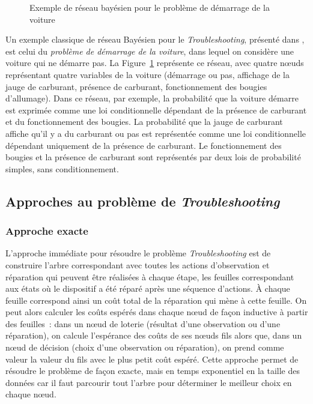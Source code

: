 \documentclass[a4paper,11pt]{article}
\theoremstyle{plain}
\theoremstyle{definition}
\begin{document}
\begin{figure}[ht]
\centering
{}
\caption{Exemple de réseau bayésien pour le problème de démarrage de la voiture}%
\label{FigExplBayesien}%
\end{figure}

Un exemple classique de réseau Bayésien pour le \emph{Troubleshooting}, présenté dans \cite{Jensen_2007}, est celui du \emph{problème de démarrage de la voiture}, dans lequel on considère une voiture qui ne démarre pas. La Figure~\ref{FigExplBayesien} représente ce réseau, avec quatre nœuds représentant quatre variables de la voiture (démarrage ou pas, affichage de la jauge de carburant, présence de carburant, fonctionnement des bougies d'allumage). Dans ce réseau, par exemple, la probabilité que la voiture démarre est exprimée comme une loi conditionnelle dépendant de la présence de carburant et du fonctionnement des bougies. La probabilité que la jauge de carburant affiche qu'il y a du carburant ou pas est représentée comme une loi conditionnelle dépendant uniquement de la présence de carburant. Le fonctionnement des bougies et la présence de carburant sont représentés par deux lois de probabilité simples, sans conditionnement.

\subsection{Approches au problème de \emph{Troubleshooting}}
\label{SecApprochesTrouble}

\subsubsection{Approche exacte}
\label{SecAlgoExacte}

L'approche immédiate pour résoudre le problème \emph{Troubleshooting} est de construire l'arbre correspondant avec toutes les actions d'observation et réparation qui peuvent être réalisées à chaque étape, les feuilles correspondant aux états où le dispositif a été réparé après une séquence d'actions. À chaque feuille correspond ainsi un coût total de la réparation qui mène à cette feuille. On peut alors calculer les coûts espérés dans chaque nœud de façon inductive à partir des feuilles~: dans un nœud de loterie (résultat d'une observation ou d'une réparation), on calcule l'espérance des coûts de ses nœuds fils alors que, dans un nœud de décision (choix d'une observation ou réparation), on prend comme valeur la valeur du fils avec le plus petit coût espéré. Cette approche permet de résoudre le problème de façon exacte, mais en temps exponentiel en la taille des données car il faut parcourir tout l'arbre pour déterminer le meilleur choix en chaque nœud.
\end{document}
